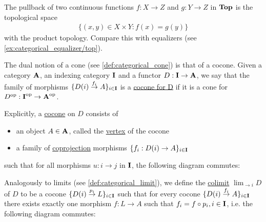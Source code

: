 \begin{example}\label{ex:categorical_pullback/top}
  The pullback of two continuous functions $f: X \to Z$ and $g: Y \to Z$ in $\operatorname{\mathbf{Top}}$ is the topological space
  \begin{align*}
    \{ (x, y) \in X \times Y \colon f(x) = g(y) \}
  \end{align*}
  with the product topology. Compare this with equalizers (see \cref{ex:categorical_equalizer/top}).
\end{example}

\begin{definition}\label{def:categorical_cocone}\cite[definition 5.2.1]{Leinster2014}
  The dual notion of a cone (see \cref{def:categorical_cone}) is that of a cocone. Given a category $\operatorname{\mathbf{A}}$, an indexing category $\operatorname{\mathbf{I}}$ and a functor $D: \operatorname{\mathbf{I}} \to \operatorname{\mathbf{A}}$, we say that the family of morphisms $\{ D(i) \overset {f_i} \to A \}_{i \in \operatorname{\mathbf{I}}}$ is a \uline{cocone for D} if it is a cone for $D^{\operatorname{op}}: \operatorname{\mathbf{I}}^{\operatorname{op}} \to \operatorname{\mathbf{A}}^{\operatorname{op}}$.

  Explicitly, a \uline{cocone} on $D$ consists of
  \begin{itemize}
    \item an object $A \in \operatorname{\mathbf{A}}$, called the \uline{vertex} of the cocone
    \item a family of \uline{coprojection} morphisms $\{ f_i: D(i) \to A \}_{i \in \operatorname{\mathbf{I}}}$
  \end{itemize}
  such that for all morphisms $u: i \to j$ in $\operatorname{\mathbf{I}}$, the following diagram commutes:
  \begin{center}
  \end{center}
\end{definition}

\begin{definition}\label{def:categorical_colimit}\cite[definition 5.1.19(b)]{Leinster2014}
  Analogously to limits (see \cref{def:categorical_limit}), we define the \uline{colimit} $\displaystyle\lim_{\to i} D$ of $D$ to be a cocone $\{ D(i) \overset {p_i} \to L \}_{i \in \operatorname{\mathbf{I}}}$ such that for every cocone $\{ D(i) \overset {f_i} \to A \}_{i \in \operatorname{\mathbf{I}}}$ there exists exactly one morphism $f: L \to A$ such that $f_i = f \circ p_i, i \in \operatorname{\mathbf{I}}$, i.e. the following diagram commutes:
  \begin{center}
  \end{center}
\end{definition}

